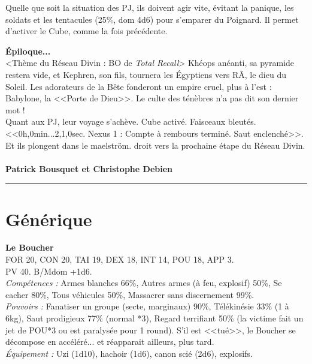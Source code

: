 \documentclass[11pt,twoside,a4paper]{book}
\begin{document}
Quelle que soit la situation des PJ, ils doivent agir vite, {\'e}vitant la panique, les soldats et les tentacules (25\%, dom 4d6) pour s'emparer du Poignard. Il permet d'activer le Cube, comme la fois pr{\'e}c{\'e}dente.~\\

\clearpage

\textbf{\large {\'E}piloque...}~\\

<Th{\`e}me du R{\'e}seau Divin : BO de \emph{Total Recall}> Kh{\'e}ops an{\'e}anti, sa pyramide restera vide, et Kephren, son fils, tournera les {\'E}gyptiens vers R{\^A}, le dieu du Soleil. Les adorateurs de la B{\^e}te fonderont un empire cruel, plus {\`a} l'est : Babylone, la <<Porte de Dieu>>. Le culte des t{\'e}n{\`e}bres n'a pas dit son dernier mot !~\\
Quant aux PJ, leur voyage s'ach{\`e}ve. Cube activ{\'e}. Faisceaux bleut{\'e}s. <<0h,0min...2,1,0sec. Nexus 1 : Compte {\`a} rembours termin{\'e}. Saut enclench{\'e}>>. Et ils plongent dans le maelstr{\"o}m. droit vers la prochaine {\'e}tape du R{\'e}seau Divin. ~\\

\textbf{Patrick Bousquet et Christophe Debien}~\\

\begin{center} \rule{10cm}{0.1cm} \end{center}


\section*{G{\'e}n{\'e}rique}

\textbf{Le Boucher}~\\
FOR 20, CON 20, TAI 19, DEX 18, INT 14, POU 18, APP 3.~\\
PV 40. B/Mdom +1d6.~\\
\emph{Comp{\'e}tences : }Armes blanches 66\%, Autres armes ({\`a} feu, explosif) 50\%, Se cacher 80\%, Tous v{\'e}hicules 50\%, Massacrer sans discernement 99\%.~\\
\emph{Pouvoirs : }Fanatiser un groupe (secte, marginaux) 90\%, T{\'e}l{\'e}kin{\'e}sie 33\% (1 {\`a} 6kg), Saut prodigieux 77\% (normal *3), Regard terrifiant 50\% (la victime fait un jet de POU*3 ou est paralys{\'e}e pour 1 round). S'il est <<tu{\'e}>>, le Boucher se d{\'e}compose en acc{\'e}l{\'e}r{\'e}... et r{\'e}apparait ailleurs, plus tard.~\\
\emph{{\'E}quipement : }Uzi (1d10), hachoir (1d6), canon sci{\'e} (2d6), explosifs.~\\~\\
\end{document}
